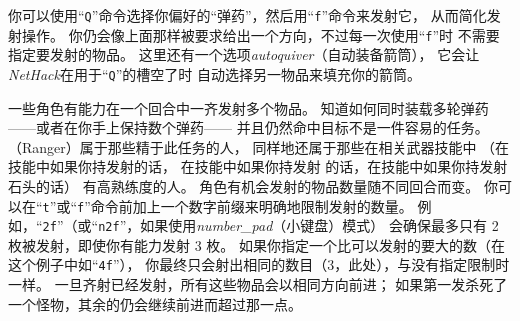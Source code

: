\documentclass[a4paper, 10pt]{article}
\begin{document}
你可以使用“{\tt Q}”命令选择你偏好的“弹药”，然后用“{\tt f}”命令来发射它，
从而简化发射操作。
你仍会像上面那样被要求给出一个方向，不过每一次使用“{\tt f}”时
不需要指定要发射的物品。
这里还有一个选项{\it autoquiver}（自动装备箭筒），
它会让{\it NetHack\/}在用于“{\tt Q}”的\zhTransInventory{}槽空了时
自动选择另一物品来填充你的箭筒。

一些角色有能力在一个回合中一齐发射多个物品。
知道如何同时装载多轮弹药——或者在你手上保持数个弹药——
并且仍然命中目标不是一件容易的任务。
\zhTransRangers{}（Ranger）属于那些精于此任务的人，
同样地还属于那些在相关武器技能中
（在\zhTransBow{}技能中如果你持\zhTransBow{}发射\zhTransArrows{}的话，
在\zhTransCrossbow{}技能中如果你持\zhTransCrossbow{}发射\zhTransCrossbowBolt
的话，在\zhTransSling{}技能中如果你持\zhTransSling{}发射石头的话）
有高熟练度的人。
角色有机会发射的物品数量随不同回合而变。
你可以在“{\tt t}”或“{\tt f}”命令前加上一个数字前缀来明确地限制发射的数量。
例如，“{\tt 2f}”（或“{\tt n2f}”，如果使用{\it number\_pad\/}（小键盘）模式）
会确保最多只有 2 枚\zhTransArrows{}被发射，即使你有能力发射 3 枚。
如果你指定一个比可以发射的要大的数（在这个例子中如“{\tt 4f}”），
你最终只会射出相同的数目（3，此处），与没有指定限制时一样。
一旦齐射已经发射，所有这些物品会以相同方向前进；
如果第一发杀死了一个怪物，其余的仍会继续前进而超过那一点。
\end{document}
